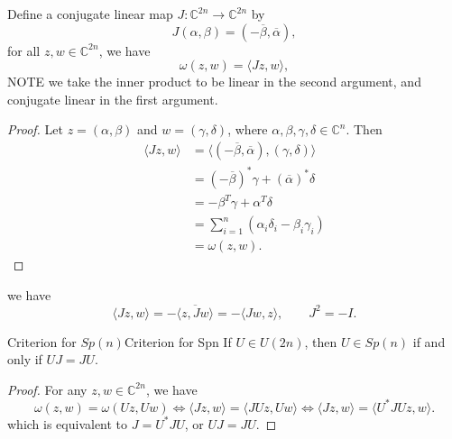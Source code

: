 \documentclass[../main.tex]{subfiles}
\begin{document}
Define a conjugate linear map $J: \mathbb{C}^{2n} \to \mathbb{C}^{2n}$ by
\begin{equation*}
	J(\alpha, \beta) = (-\overline{\beta}, \overline{\alpha}),
\end{equation*}
for all $z,w \in \mathbb{C}^{2n}$, we have
\begin{equation*}
	\omega(z,w) = \langle J z, w \rangle,
\end{equation*}
NOTE we take the inner product to be linear in the second argument, and conjugate linear in the first argument.
\begin{proof}
	Let $z = (\alpha, \beta)$ and $w = (\gamma, \delta)$, where $\alpha, \beta, \gamma, \delta \in \mathbb{C}^n$. Then
	\begin{align*}
		\langle J z, w \rangle & = \langle (-\overline{\beta}, \overline{\alpha}), (\gamma, \delta) \rangle \\
		                       & = (-\overline{\beta})^* \gamma + (\overline{\alpha})^* \delta              \\
		                       & = -\beta^T \gamma + \alpha^T \delta                                        \\
		                       & = \sum_{i=1}^n (\alpha_i \delta_i - \beta_i \gamma_i)                      \\
		                       & = \omega(z,w).
	\end{align*}
\end{proof}
we have
\begin{equation*}
	\langle J z, w \rangle = - \overline{\langle z, J w \rangle} = - \langle J w, z \rangle, \qquad J^2 = -I.
\end{equation*}

\begin{proposition}{Criterion for $Sp(n)$}{Criterion for Spn}
	If $U\in U(2n)$, then $U \in Sp(n)$ if and only if $U J = J U$.
\end{proposition}
\begin{proof}
	For any $z,w \in \mathbb{C}^{2n}$, we have
	\begin{equation*}
		\omega(z,w) = \omega(U z, U w) \Leftrightarrow \langle J z, w \rangle = \langle J U z, U w \rangle \Leftrightarrow \langle J z, w \rangle = \langle U^* J U z, w \rangle.
	\end{equation*}
	which is equivalent to $J = U^* J U$, or $U J = J U$.
\end{proof}
\end{document}

